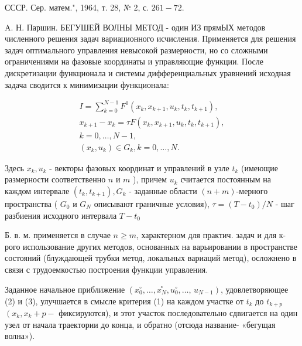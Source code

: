 \documentclass[10pt]{article}
\begin{document}
СССР. Сер. матем.", 1964, т. 28, № 2, с. $261-72$.



A. Н. Паршин. БЕГУШЕЙ ВОЛНЫ МЕТОД - один ИЗ прямЫХ методов численного решения задач вариационного исчисления. Применяется для решения задач оптимального управления невысокой размерности, но со сложными ограничениями на фазовые координаты и управляющие функции. После дискретизации функционала и системы дифференциальных уравнений исходная задача сводится к минимизации функционала:



\[

\begin{gathered}

I=\sum_{k=0}^{N-1} F^{0}\left(x_{k}, x_{k+1}, u_{k}, t_{k}, t_{k+1}\right), \\

x_{k+1}-x_{k}=\tau F\left(x_{k}, x_{k+1}, u_{k}, t_{k}, t_{k+1}\right), \\

k=0, \ldots, N-1, \\

\left(x_{k}, u_{k}\right) \in G_{k}, k=0, \ldots, N .

\end{gathered}

\]



Здесь $x_{k}, u_{k}$ - векторы фазовых координат и управлений в узле $t_{k}$ (имеющие размерности соответственно $n$ и $m$ ), причем $u_{k}$ считается постоянным на каждом интервале $\left(t_{k}, t_{k+1}\right), G_{k}$ - заданные области $(n+m)$-мерного пространства ( $G_{0}$ и $G_{N}$ описывают граничные условия), $\tau=\left(T-t_{0}\right) / N$ - шаг разбиения исходного интервала $T-t_{0}$



Б. в. м. применяется в случае $n \geqslant m$, характерном для практич. задач и для к-рого использование других методов, основанных на варьировании в пространстве состояний (блуждающей трубки метод, локальных вариаций метод), осложнено в связи с трудоемкостью построения функции управления.



Заданное начальное приближение $\left(x_{0}^{\circ}, \ldots, \stackrel{\circ}{x_{N}}, u_{0}^{\circ}, \ldots\right.$, $\left.u_{N-1}\right)$, удовлетворяющее (2) и (3), улучшается в смысле критерия (1) на каждом участке от $t_{k}$ до $t_{k+p}$ $\left(x_{k}, x_{k}+p-\right.$ фиксируются), и этот участок последовательно сдвигается на один узел от начала траектории до конца, и обратно (отсюда название- «бегущая волна»).
\end{document}
